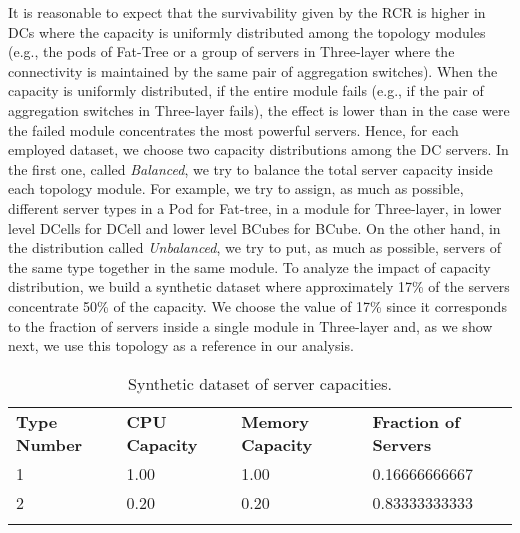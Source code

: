 It is reasonable to expect that the survivability given by the RCR is higher in DCs where the capacity is uniformly distributed among the topology modules (e.g., the pods of Fat-Tree or a group of servers in Three-layer where the connectivity is maintained by the same pair of aggregation switches). When the capacity is uniformly distributed, if the entire module fails (e.g., if the pair of aggregation switches in Three-layer fails), the effect is lower than in the case were the failed module concentrates the most powerful servers. Hence, for each employed dataset, we choose two capacity distributions among the DC servers. In the first one, called \textit{Balanced}, we try to balance the total server capacity inside each topology module. For example, we try to assign, as much as possible, different server types in a Pod for Fat-tree, in a module for Three-layer, in lower level DCells for DCell and lower level BCubes for BCube. On the other hand, in the distribution called \textit{Unbalanced}, we try to put, as much as possible, servers of the same type together in the same module.
To analyze the impact of capacity distribution, we build a synthetic dataset where approximately 17\% of the servers concentrate 50\% of the capacity. We choose the value of 17\% since it corresponds to the fraction of servers inside a single module in Three-layer and, as we show next, we use this topology as a reference in our analysis.
\begin{table}
\caption{Synthetic dataset of server capacities.}
\label{tab:syntheticData}
\begin{tabular}{llll}
\hline\noalign{\smallskip}
\hline \textbf{Type Number} &\textbf{CPU Capacity} &\textbf{Memory Capacity} &\textbf{Fraction of Servers}\\
\noalign{\smallskip}\hline\noalign{\smallskip}
1 &1.00 &1.00 &0.16666666667 \\
2 &0.20 &0.20 &0.83333333333 \\
\noalign{\smallskip}\hline
\end{tabular}
\end{table}

